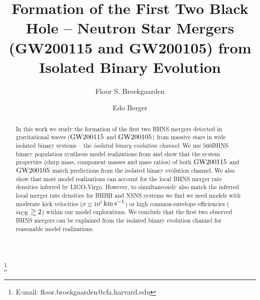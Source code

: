 \documentclass{aastex63}
\newcommand{\kms}{\ensuremath{\,\rm{km}\,\rm{s}^{-1}}\xspace}
\newcommand{\Nmodels}{\ensuremath{560}\xspace}
\newcommand{\gwone}{\ensuremath{\rm{GW200115}}\xspace}
\newcommand{\gwzero}{\ensuremath{\rm{GW200105}}\xspace}
\begin{document}
\title{Formation of the First Two Black Hole – Neutron Star Mergers (GW200115 and GW200105) from Isolated Binary Evolution}


\author[0000-0002-4421-4962]{Floor S. Broekgaarden}\thanks{E-mail: floor.broekgaarden@cfa.harvard.edu}

\author[0000-0002-9392-9681]{Edo Berger}


\begin{abstract}
In this work we study the formation of the first two \ac{BHNS} mergers detected in gravitational waves (\gwone and \gwzero) from massive stars in wide isolated binary systems -- the \textit{isolated binary evolution channel}. We use \Nmodels \ac{BHNS} binary population synthesis model realizations from \citet{ZenodoDCOBHNS:2021} and show that the system properties (chirp mass, component masses and mass ratios) of both \gwone and \gwzero match predictions from the isolated binary evolution channel. We also show that most model realizations can account for the local \ac{BHNS} merger rate densities inferred by LIGO-Virgo. However, to simultaneously also match the inferred local merger rate densities for BHBH and NSNS systems we find we need models with moderate kick velocities ($\sigma\lesssim 10^2$\kms) or high common-envelope efficiencies ($\alpha_{\rm{CE}}\gtrsim 2$) within our model explorations.  We conclude that the first two observed \ac{BHNS} mergers can be explained from the isolated binary evolution channel for reasonable model realizations.
% 
%
\end{abstract}




\end{document}
